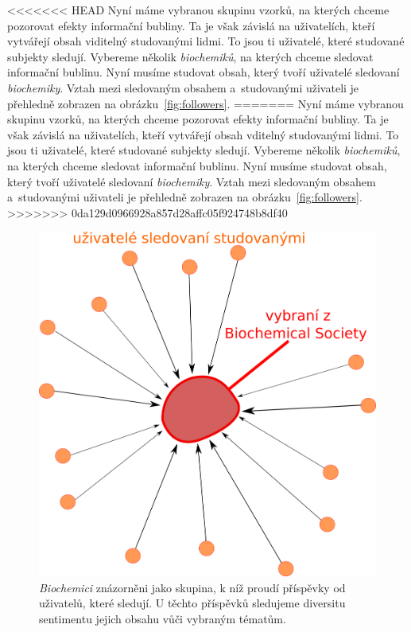 \documentclass[12pt, a4paper]{article}
\numberwithin{equation}{section} 	%
\begin{document}
<<<<<<< HEAD
Nyní máme vybranou skupinu vzorků, na kterých chceme pozorovat efekty informační bubliny. Ta je však závislá na uživatelích, kteří vytvářejí obsah viditelný studovanými lidmi. To jsou ti uživatelé, které studované subjekty sledují. Vybereme několik \textit{biochemiků}, na kterých chceme sledovat informační bublinu. Nyní musíme studovat obsah, který tvoří uživatelé sledovaní \textit{biochemiky}. Vztah mezi sledovaným obsahem a~studovanými uživateli je přehledně zobrazen na obrázku~\autoref{fig:followers}.
=======
Nyní máme vybranou skupinu vzorků, na kterých chceme pozorovat efekty informační bubliny. Ta je však závislá na uživatelích, kteří vytvářejí obsah vditelný studovanými lidmi. To jsou ti uživatelé, které studované subjekty sledují. Vybereme několik \textit{biochemiků}, na kterých chceme sledovat informační bublinu. Nyní musíme studovat obsah, který tvoří uživatelé sledovaní \textit{biochemiky}. Vztah mezi sledovaným obsahem a~studovanými uživateli je přehledně zobrazen na obrázku~\autoref{fig:followers}.
>>>>>>> 0da129d0966928a857d28affc05f924748b8df40
\begin{figure}[h]
\centering
\includegraphics[scale=0.35]{./Pics/followers.png}
    \caption{\textit{Biochemici} znázorněni jako skupina, k níž proudí příspěvky od uživatelů, které sledují. U těchto příspěvků sledujeme diversitu sentimentu jejich obsahu vůči vybraným tématům.}\label{fig:followers}
\end{figure}
\end{document}
